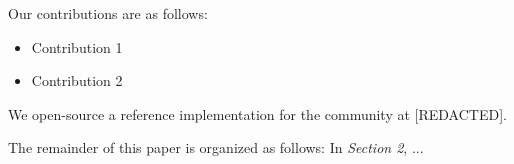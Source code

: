 




Our contributions are as follows:

\begin{itemize}
\item
  Contribution 1

\item
  Contribution 2

\end{itemize}


We open-source a reference implementation for the community at [REDACTED].

The remainder of this paper is organized as follows: In \textit{Section 2}, ...

